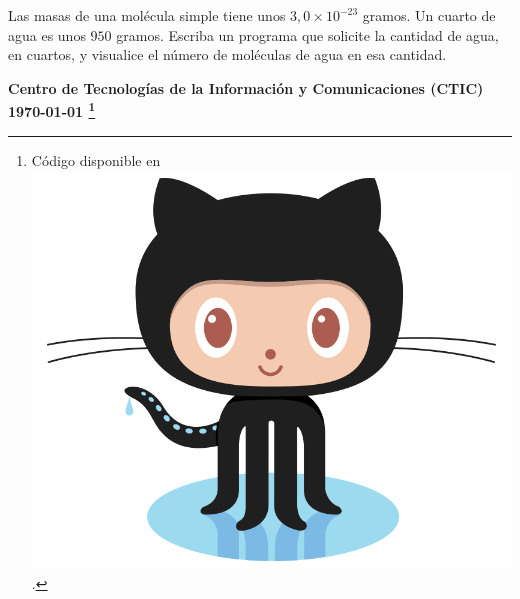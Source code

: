 \documentclass[spanish,addpoints,answers,a4paper]{exam}
\newcommand{\unmarkedfntext}[1]{%
	\begingroup
	\renewcommand\thefootnote{}\footnote{#1}%
	\addtocounter{footnote}{-1}%
	\endgroup
}
\newcommand{\mychar}{%
	\begingroup\normalfont
	\includegraphics[height=\fontcharht\font`\B]{Octocat.png}%
	\endgroup
}
\begin{document}
\begin{questions}
\begin{solution}
	
\end{solution}

\question Las masas de una molécula simple tiene unos $3,0\times10^{-23}$ gramos. Un cuarto de agua es unos $950$ gramos. Escriba un programa que solicite la cantidad de agua, en cuartos, y visualice el número de moléculas de agua en esa cantidad.

\begin{solution}
	
\end{solution}

\end{questions}

\begin{flushright}\bfseries
Centro de Tecnologías de la Información y Comunicaciones (CTIC)\\[2mm]
\today\unmarkedfntext{Código disponible en \href{https://github.com/carlosal1015/C-Programming}{\mychar{}}.}
\end{flushright}
\end{document}
